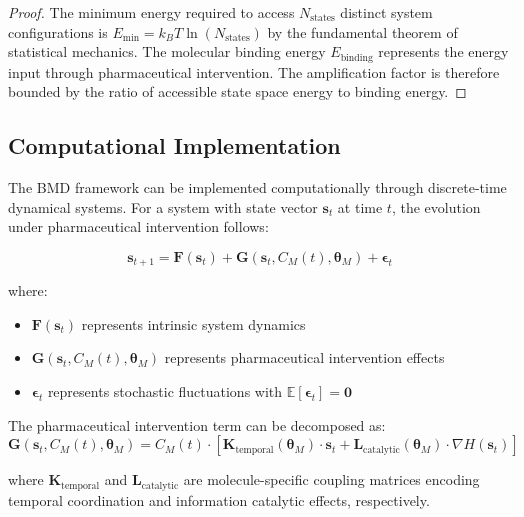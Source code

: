 \documentclass[12pt,a4paper]{article}
\begin{document}
\begin{proof}
The minimum energy required to access $N_{\text{states}}$ distinct system configurations is $E_{\text{min}} = k_B T \ln(N_{\text{states}})$ by the fundamental theorem of statistical mechanics. The molecular binding energy $E_{\text{binding}}$ represents the energy input through pharmaceutical intervention. The amplification factor is therefore bounded by the ratio of accessible state space energy to binding energy.
\end{proof}

\subsection{Computational Implementation}

The BMD framework can be implemented computationally through discrete-time dynamical systems. For a system with state vector $\mathbf{s}_t$ at time $t$, the evolution under pharmaceutical intervention follows:

\begin{equation}
\mathbf{s}_{t+1} = \mathbf{F}(\mathbf{s}_t) + \mathbf{G}(\mathbf{s}_t, C_M(t), \boldsymbol{\theta}_M) + \boldsymbol{\epsilon}_t
\end{equation}

where:
\begin{itemize}
\item $\mathbf{F}(\mathbf{s}_t)$ represents intrinsic system dynamics
\item $\mathbf{G}(\mathbf{s}_t, C_M(t), \boldsymbol{\theta}_M)$ represents pharmaceutical intervention effects
\item $\boldsymbol{\epsilon}_t$ represents stochastic fluctuations with $\mathbb{E}[\boldsymbol{\epsilon}_t] = \mathbf{0}$
\end{itemize}

The pharmaceutical intervention term can be decomposed as:
\begin{equation}
\mathbf{G}(\mathbf{s}_t, C_M(t), \boldsymbol{\theta}_M) = C_M(t) \cdot \left[ \mathbf{K}_{\text{temporal}}(\boldsymbol{\theta}_M) \cdot \mathbf{s}_t + \mathbf{L}_{\text{catalytic}}(\boldsymbol{\theta}_M) \cdot \nabla H(\mathbf{s}_t) \right]
\end{equation}

where $\mathbf{K}_{\text{temporal}}$ and $\mathbf{L}_{\text{catalytic}}$ are molecule-specific coupling matrices encoding temporal coordination and information catalytic effects, respectively.
\end{document}
